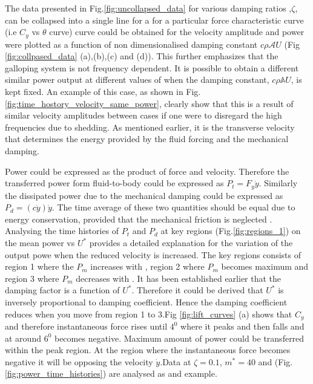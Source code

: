  The data presented in Fig.\ref{fig:uncollapsed_data} for various damping ratios ,$\zeta$, can be collapsed into a single line for a for a particular force characteristic curve (i.e $C_y$ vs $\theta$ curve)  curve could be obtained for the velocity amplitude  and power were plotted as a function of  non dimensionalised  damping constant $c\rho\mathcal{A}U$ 
(Fig \ref{fig:collpased_data} (a),(b),(c) and (d)).  This further emphasizes that the galloping system is not frequency dependent. It is possible to obtain a different similar power output at different values of \ustar when the damping constant, $c\rho\mathbb{A}U$, is kept fixed. An example of this case, as shown in Fig.\ref{fig:time_hostory_velocity_same_power}, clearly show that this is a result of similar velocity amplitudes between cases if one were to disregard the high frequencies due to shedding. As mentioned earlier, it is the transverse velocity that determines the energy provided by the fluid forcing and the mechanical damping.


 



 
 Power could be expressed as the product of force and velocity. Therefore the transferred power form fluid-to-body could be expressed as $P_t=F_y\dot{y}$. Similarly the dissipated power due to the mechanical damping could be expressed as $P_d=(c\dot{y})\dot{y}$. The time average of these two quantities should be equal due to energy conservation, provided that the mechanical friction is neglected . Analysing the  time histories of $P_t $ and $P_d$ at key regions (Fig.\ref{fig:regions_1}) on the mean power vs $U^*$ provides a detailed explanation for the variation of the output powe when the reduced velocity is increased. The key regions consists of region 1 where the $P_m$ increases with \ustar, region 2 where $P_m$ becomes maximum and region 3 where $P_m$ decreases with \ustar. It has been established earlier that the damping factor is a function of $U^*$. Therefore it could be derived that $U^*$ is inversely proportional to damping coefficient. Hence the damping coefficient reduces when you move from region 1 to 3.Fig \ref{fig:lift_curves} (a) shows that $C_y$ and therefore instantaneous force rises until $4^0$ where it peaks and then falls and at around $6^0$ becomes negative. Maximum amount of power could be transferred within the peak region. At the region where the instantaneous force becomes negative it will be opposing the velocity $\dot{y}$.Data at $\zeta=0.1$, $m^*=40$ and  (Fig.\ref{fig:power_time_histories}) are analysed as and example.  

